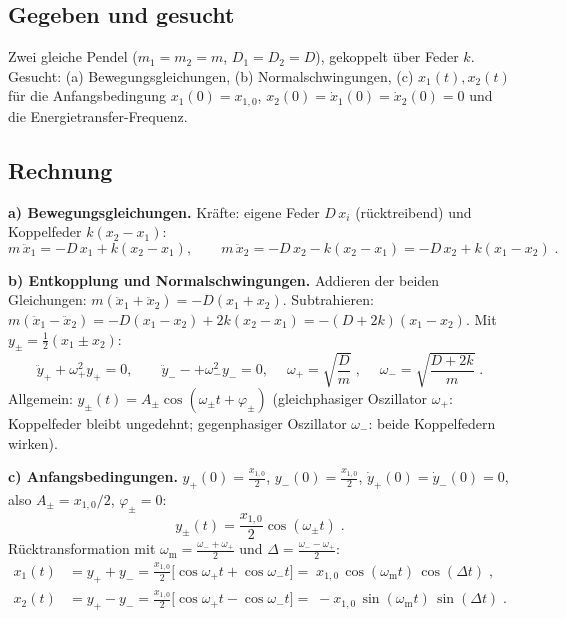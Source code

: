 
\subsection*{Gegeben und gesucht}
Zwei gleiche Pendel ($m_1=m_2=m$, $D_1=D_2=D$), gekoppelt über Feder $k$.
Gesucht: (a) Bewegungsgleichungen, (b) Normalschwingungen, (c) $x_1(t),x_2(t)$
für die Anfangsbedingung $x_1(0)=x_{1,0}$, $x_2(0)=\dot x_1(0)=\dot x_2(0)=0$
und die Energietransfer-Frequenz.

\subsection*{Rechnung}
\textbf{a) Bewegungsgleichungen.} Kräfte: eigene Feder $D\,x_i$ (rücktreibend)
und Koppelfeder $k(x_2-x_1)$:
\begin{equation}
  m\,\ddot x_1=-D\,x_1+k(x_2-x_1),\qquad
  m\,\ddot x_2=-D\,x_2-k(x_2-x_1)= -D\,x_2+k(x_1-x_2)\;.
\end{equation}

\textbf{b) Entkopplung und Normalschwingungen.} Addieren der beiden
Gleichungen: $m(\ddot x_1+\ddot x_2)=-D(x_1+x_2)$. Subtrahieren:
$m(\ddot x_1-\ddot x_2)=-D(x_1-x_2)+2k(x_2-x_1)=-(D+2k)(x_1-x_2)$. Mit
$y_\pm=\tfrac12(x_1\pm x_2)$:
\begin{equation}
  \ddot y_++\omega_+^2y_+=0,\qquad \ddot y_--+\omega_-^2y_-=0,
  \quad
  \boxed{\;\omega_+=\sqrt{\frac{D}{m}}\;},\quad
  \boxed{\;\omega_-=\sqrt{\frac{D+2k}{m}}\;}.
\end{equation}
Allgemein: $y_\pm(t)=A_\pm\cos(\omega_\pm t+\varphi_\pm)$
(gleichphasiger Oszillator $\omega_+$: Koppelfeder bleibt ungedehnt;
gegenphasiger Oszillator $\omega_-$: beide Koppelfedern wirken).

\textbf{c) Anfangsbedingungen.} $y_+(0)=\tfrac{x_{1,0}}2$, $y_-(0)=\tfrac{x_{1,0}}2$,
$\dot y_+(0)=\dot y_-(0)=0$, also $A_\pm=x_{1,0}/2$, $\varphi_\pm=0$:
\begin{equation}
  y_\pm(t)=\frac{x_{1,0}}2\cos(\omega_\pm t)\;.
\end{equation}
Rücktransformation mit $\omega_{\mathrm m}=\frac{\omega_-+\omega_+}2$ und
$\Delta=\frac{\omega_--\omega_+}2$:
\begin{align}
  x_1(t)&=y_++y_-=\frac{x_{1,0}}2\big[\cos\omega_+t+\cos\omega_-t\big]
         =\boxed{\;x_{1,0}\,\cos(\omega_{\mathrm m}t)\,\cos(\Delta t)\;},\\
  x_2(t)&=y_+-y_-=\frac{x_{1,0}}2\big[\cos\omega_+t-\cos\omega_-t\big]
         =\boxed{\;-x_{1,0}\,\sin(\omega_{\mathrm m}t)\,\sin(\Delta t)\;}.
\end{align}

